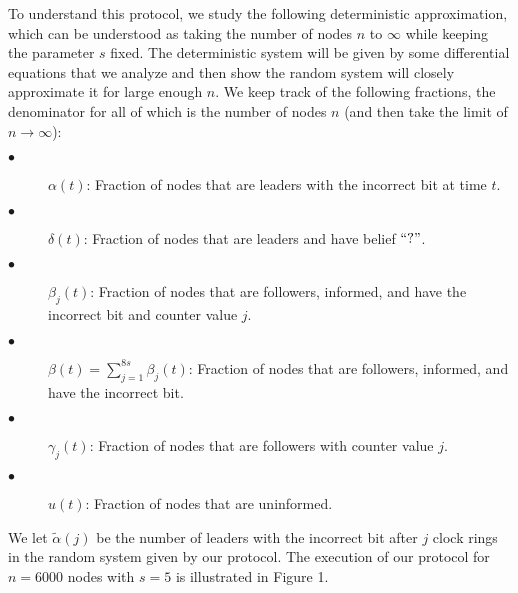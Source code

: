 \documentclass[a4paper,12pt]{article}
\newcommand{\q}{$``?"$}
\begin{document}
To understand this protocol, we study the following deterministic approximation, which can be understood as taking the number of nodes $n$ to $\infty$ while keeping the parameter $s$ fixed. The deterministic system will be given by some differential equations that we analyze and then show the random system will closely approximate it for large enough $n$. We keep track of the following fractions, the denominator for all of which is the number of nodes $n$ (and then take the limit of $n \to \infty$):
\begin{description}
	\item[$\bullet$] $\alpha(t)$: Fraction of nodes that are leaders with the incorrect bit at time $t$.
	\item[$\bullet$] $\delta(t)$: Fraction of nodes that are leaders and have belief \q.
	\item[$\bullet$] $\beta_j(t)$: Fraction of nodes that are followers, informed, and have the incorrect bit and counter value $j$.
	\item[$\bullet$] $\beta(t) = \sum_{j=1}^{8s} \beta_j(t)$: Fraction of nodes that are followers, informed, and have the incorrect bit.
	\item[$\bullet$] $\gamma_j(t)$: Fraction of nodes that are followers with counter value $j$.
	\item[$\bullet$] $u(t)$: Fraction of nodes that are uninformed.
\end{description}

We let $\widetilde{\alpha}(j)$ be the number of leaders with the incorrect bit after $j$ clock rings in the random system given by our protocol.
The execution of our protocol for $n=6000$ nodes with $s=5$ is illustrated in Figure 1. 
\end{document}

